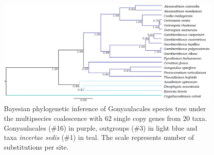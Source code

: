 \documentclass[12pt]{article}
\begin{document}
\begin{figure} 
\includegraphics[scale=.25]{figures/Aug2_20-taxa-combined-fig_MCC_trees.png} 
\caption{Bayesian phylogenetic inference of Gonyaulacales species tree under the multipsecies coalescence with 62 single copy genes from 20 taxa. Gonyaulacales (\#16) in purple, outgroups (\#3) in light blue and taxa \textit{incertae sedis} (\#1) in teal. The scale represents number of substitutions per site.} 
\label{fig:SCmscBI}
\end{figure} 
\FloatBarrier

\newpage
\end{document}
